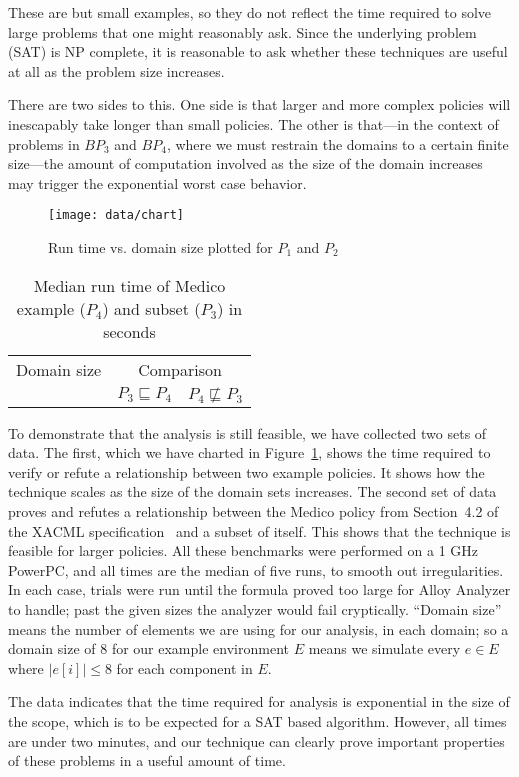 These are but small examples, so they do not reflect the time required
to solve large problems that one might reasonably ask.  Since the
underlying problem (SAT) is NP complete, it is reasonable to ask
whether these techniques are useful at all as the problem size
increases.

There are two sides to this.  One side is that larger and more complex
policies will inescapably take longer than small policies.  The other
is that---in the context of problems in $BP_3$ and $BP_4$, where we
must restrain the domains to a certain finite size---the amount of
computation involved as the size of the domain increases may trigger
the exponential worst case behavior.

\begin{figure}
  \centering
  \texttt{[image: data/chart]}
  \caption{Run time vs. domain size plotted for $P_1$ and $P_2$}
  \label{fig:graph}
\end{figure}

\begin{table}
\centering
\begin{tabular}{ccc}
Domain size & \multicolumn{2}{c}{Comparison} \\
& $P_3 \sqsubseteq P_4$ & $P_4 \not\sqsubseteq P_3$ \\

\end{tabular}
\caption{Median run time of Medico example ($P_4$) and subset ($P_3$) in seconds}
\label{tbl:bigdata}
\end{table}

To demonstrate that the analysis is still feasible, we have collected
two sets of data.  The first, which we have charted in
Figure~\ref{fig:graph}, shows the time required to verify or refute a
relationship between two example policies.  It shows how the technique
scales as the size of the domain sets increases.  The second set of
data proves and refutes a relationship between the Medico policy from
Section~4.2 of the XACML specification~\cite{xacml} and a subset of
itself.  This shows that the technique is feasible for larger
policies.  All these benchmarks were performed on a 1 GHz PowerPC, and
all times are the median of five runs, to smooth out irregularities.
In each case, trials were run until the formula proved too large for
Alloy Analyzer to handle; past the given sizes the analyzer would fail
cryptically.  ``Domain size'' means the number of elements we are
using for our analysis, in each domain; so a domain size of 8 for our
example environment $E$ means we simulate every $e \in E$ where
$|e[i]| \leq 8$ for each component in $E$.

The data indicates that the time required for analysis is exponential
in the size of the scope, which is to be expected for a SAT based
algorithm.  However, all times are under two minutes, and our
technique can clearly prove important properties of these problems in
a useful amount of time.


